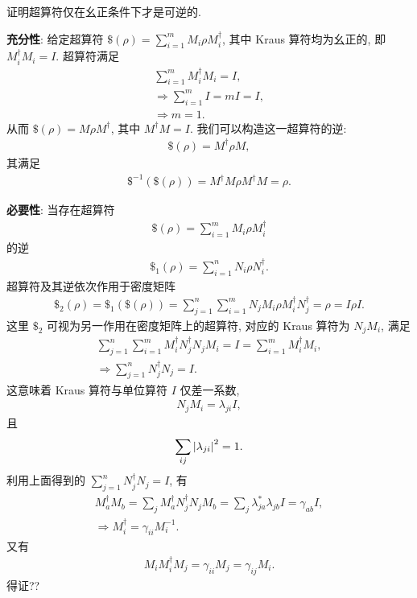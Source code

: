 \documentclass{assignment}
\begin{document}
\begin{probcontinued}{8}
    证明超算符仅在幺正条件下才是可逆的.
\end{probcontinued}
\begin{pf}
    \textbf{充分性}: 给定超算符 $\$(\rho)=\sum_{i=1}^mM_i\rho M_i^{\dagger}$, 其中 Kraus 算符均为幺正的, 即 $M_i^{\dagger}M_i=I$. 超算符满足
    \begin{gather}
        \sum_{i=1}^mM_i^{\dagger}M_i=I,\\
        \Longrightarrow\sum_{i=1}^mI=mI=I,\\
        \Longrightarrow m=1.
    \end{gather}
    从而 $\$(\rho)=M\rho M^{\dagger}$, 其中 $M^{\dagger}M=I$. 我们可以构造这一超算符的逆:
    \begin{align}
        \$(\rho)=M^{\dagger}\rho M,
    \end{align}
    其满足
    \begin{align}
        \$^{-1}(\$(\rho))=M^{\dagger}M\rho M^{\dagger}M=\rho.
    \end{align}

    \textbf{必要性}: 当存在超算符
    \begin{align}
        \$(\rho)=\sum_{i=1}^mM_i\rho M_i^{\dagger}
    \end{align}
    的逆
    \begin{align}
        \$_1(\rho)=\sum_{i=1}^nN_i\rho N_i^{\dagger}.
    \end{align}
    超算符及其逆依次作用于密度矩阵
    \begin{align}
        \$_2(\rho)=\$_1(\$(\rho))=\sum_{j=1}^n\sum_{i=1}^mN_jM_i\rho M_i^{\dagger}N_j^{\dagger}=\rho=I\rho I.
    \end{align}
    这里 $\$_2$ 可视为另一作用在密度矩阵上的超算符, 对应的 Kraus 算符为 $N_jM_i$, 满足
    \begin{gather}
        \sum_{j=1}^n\sum_{i=1}^mM_i^{\dagger}N_j^{\dagger}N_jM_i=I=\sum_{i=1}^mM_i^{\dagger}M_i,\\
        \Longrightarrow\sum_{j=1}^nN_j^{\dagger}N_j=I.
    \end{gather}
    这意味着 Kraus 算符与单位算符 $I$ 仅差一系数,
    \begin{align}
        N_jM_i=\lambda_{ji}I,
    \end{align}
    且
    \begin{align}
        \sum_{ij}\left\lvert\lambda_{ji}\right\rvert^2=1.
    \end{align}
    利用上面得到的 $\sum_{j=1}^nN_j^{\dagger}N_j=I$, 有
    \begin{gather}
        M_a^{\dagger}M_b=\sum_jM_a^{\dagger}N_j^{\dagger}N_jM_b=\sum_j\lambda_{ja}^*\lambda_{jb}I=\gamma_{ab}I,\\
        \Longrightarrow M_i^{\dagger}=\gamma_{ii}M_i^{-1}.
    \end{gather}
    又有
    \begin{align}
        M_iM_i^{\dagger}M_j=\gamma_{ii}M_j=\gamma_{ij}M_i.
    \end{align}
    得证??
\end{pf}
\end{document}
